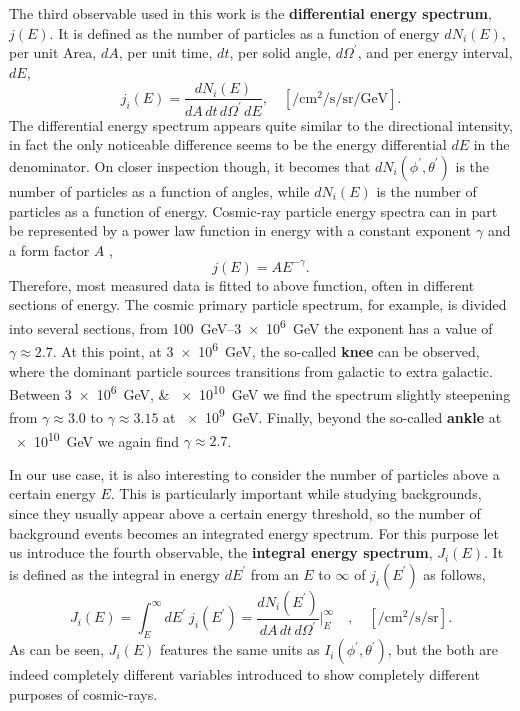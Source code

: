 The third observable used in this work is the \textbf{differential energy spectrum}, $j(E)$. It is defined as the number of particles as a function of energy $dN_i(E)$, per unit Area, $dA$, per unit time, $dt$, per solid angle, $d\Omega^{\prime}$, and per energy interval, $dE$, \cite{CosmicRayGrieder}
\begin{equation} \label{eq:DifferentialEnergySpectrum}
    j_i(E) = \frac{dN_i(E)}{dA \, dt \, d\Omega^{\prime} \, dE}, \quad \left[ \si{\per\centi\metre\squared\per\second\per\steradian\per\giga\electronvolt} \right].
\end{equation}
The differential energy spectrum appears quite similar to the directional intensity, in fact the only noticeable difference seems to be the energy differential $dE$ in the denominator. On closer inspection though, it becomes that $dN_i(\phi^{\prime},\theta^{\prime})$ is the number of particles as a function of angles, while $dN_i(E)$ is the number of particles as a function of energy. Cosmic-ray particle energy spectra can in part be represented by a power law function in energy with a constant exponent $\gamma$ and a form factor $A$ \cite{CosmicRayGrieder}, \ie
\begin{equation} \label{eq:CosmicRayEnergyDependency}
    j(E) = AE^{-\gamma}.
\end{equation}
Therefore, most measured data is fitted to above function, often in different sections of energy. The cosmic primary particle spectrum, for example, is divided into several sections, from \SIrange{100}{3e6}{\giga\electronvolt} the exponent has a value of $\gamma \approx 2.7$. At this point, \ie at \SI{3e6}{\giga\electronvolt}, the so-called \textbf{knee} can be observed, where the dominant particle sources transitions from galactic to extra galactic. Between \SIlist{3e6;e10}{\giga\electronvolt} we find the spectrum slightly steepening from $\gamma \approx 3.0$ to $\gamma \approx 3.15$ at \SI{e9}{\giga\electronvolt}. Finally, beyond the so-called \textbf{ankle} at \SI{e10}{\giga\electronvolt} we again find $\gamma \approx 2.7$.

In our use case, it is also interesting to consider the number of particles above a certain energy $E$. This is particularly important while studying backgrounds, since they usually appear above a certain energy threshold, so the number of background events becomes an integrated energy spectrum. For this purpose let us introduce the fourth observable, the \textbf{integral energy spectrum}, $J_i(E)$. It is defined as the integral in energy $dE^{\prime}$ from an $E$ to $\infty$ of $j_i(E^{\prime})$ as follows, \cite{CosmicRayGrieder}
\begin{equation} \label{eq:IntegralEnergySpectrum}
    J_i(E) = \int_{E}^{\infty} dE^{\prime} \ j_i(E^{\prime}) = \frac{dN_i(E^{\prime})}{dA \, dt \, d\Omega^{\prime}} \Biggr|_{E}^{\infty} \quad , \quad \left[ \si{\per\centi\metre\squared\per\second\per\steradian} \right].
\end{equation}
As can be seen, $J_i(E)$ features the same units as $I_i(\phi^{\prime},\theta^{\prime})$, but the both are indeed completely different variables introduced to show completely different purposes of cosmic-rays.

